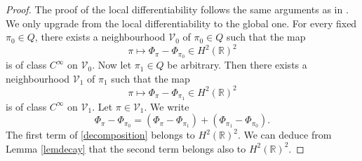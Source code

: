 \documentclass[11pt]{article}
\numberwithin{equation}{section}
\newcommand{\1}{\mathbbm{1}}
\numberwithin{equation}{section}
\theoremstyle{definition}
\def \R {\mathbb{R}}
\def \V {\mathcal{V}}
\numberwithin{equation}{section}
\begin{document}
\begin{proof} The proof of the local differentiability follows the same arguments as in \cite[Theorem 3.2]{kenne2026}. We only upgrade from the local differentiability to the global one. For every fixed $\pi_0\in Q$, there exists a neighbourhood $\V_0$ of $\pi_0\in Q$ such that the map
	\begin{equation*}
		\pi \longmapsto
		\Phi_{\pi}-\Phi_{\pi_0}\in H^2(\R)^2
	\end{equation*}
	is of class $C^\infty$ on $\V_0$.  Now let $\pi_1\in Q$ be arbitrary. Then there exists a neighbourhood $\V_1$ of $\pi_1$ such that the map
	\begin{equation*}
		\pi\mapsto
		\Phi_{\pi}-\Phi_{\pi_1}\in H^2(\R)^2
	\end{equation*}
	is of class $C^\infty$ on $\V_1$. Let $\pi\in \V_1$. We write
	\begin{equation}\label{decomposition}
		\Phi_{\pi}-\Phi_{\pi_0}= (\Phi_{\pi}-\Phi_{\pi_1}) + (\Phi_{\pi_1}-\Phi_{\pi_0}).
	\end{equation}
	The first term of \eqref{decomposition} belongs to $H^2(\R)^2$. We can deduce from Lemma \ref{lemdecay} that the second term belongs also to $H^2(\R)^2$.

\end{proof}
\end{document}
